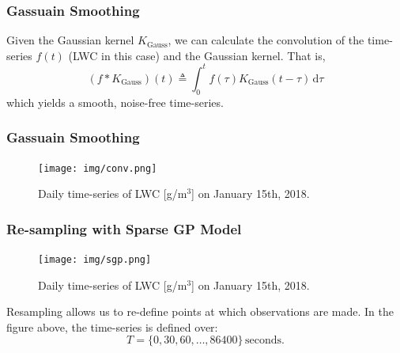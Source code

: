\documentclass{beamer}
\begin{document}
\begin{frame}
    \frametitle{Gassuain Smoothing}
    Given the Gaussian kernel $K_\mathrm{Gauss}$, we can calculate the convolution of the time-series $f(t)$ (LWC in this case) and the Gaussian kernel. That is,
    \begin{equation}
        (f * K_\mathrm{Gauss})(t) \triangleq \int_0^t f(\tau) K_\mathrm{Gauss}(t - \tau) \,\mathrm{d} \tau
    \end{equation}
    which yields a smooth, noise-free time-series.
\end{frame}

\begin{frame}
    \frametitle{Gassuain Smoothing}
    \begin{figure}
        \centering
        \texttt{[image: img/conv.png]}
        \caption{Daily time-series of LWC [g/m$^3$] on January 15th, 2018.}
    \end{figure}
\end{frame}

\begin{frame}
    \frametitle{Re-sampling with Sparse GP Model}
    \begin{figure}
        \centering
        \texttt{[image: img/sgp.png]}
        \caption{Daily time-series of LWC [g/m$^3$] on January 15th, 2018.}
    \end{figure}

    Resampling allows us to re-define points at which observations are made. In the figure above, the time-series is defined over:
    \begin{equation*}
        T = \{ 0, 30, 60, \dots, 86400 \} \, \mathrm{seconds}.
    \end{equation*}
\end{frame}
\end{document}
